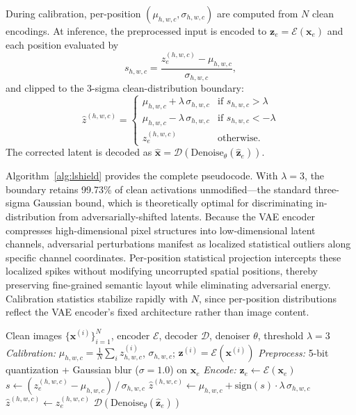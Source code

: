 \documentclass[conference]{IEEEtran}
\begin{document}
\label{sec:algorithm}
During calibration, per-position $(\mu_{h,w,c},\sigma_{h,w,c})$ are computed from
$N$ clean encodings. At inference, the preprocessed input is encoded to
$\mathbf{z}_e\!=\!\mathcal{E}(\mathbf{x}_e)$ and each position evaluated by
\begin{equation}
  s_{h,w,c} = \frac{z_e^{(h,w,c)} - \mu_{h,w,c}}{\sigma_{h,w,c}},
\end{equation}
and clipped to the 3-sigma clean-distribution boundary:
\begin{equation}
  \hat{z}^{(h,w,c)} =
  \begin{cases}
    \mu_{h,w,c} + \lambda\,\sigma_{h,w,c} & \text{if } s_{h,w,c} > \lambda \\
    \mu_{h,w,c} - \lambda\,\sigma_{h,w,c} & \text{if } s_{h,w,c} < -\lambda \\
    z_e^{(h,w,c)} & \text{otherwise.}
  \end{cases}
\end{equation}
The corrected latent is decoded as
$\hat{\mathbf{x}}\!=\!\mathcal{D}(\mathrm{Denoise}_\theta(\hat{\mathbf{z}}_e))$.

Algorithm~\ref{alg:lshield} provides the complete pseudocode.
With $\lambda\!=\!3$, the boundary retains 99.73\% of clean activations
unmodified---the standard three-sigma Gaussian bound, which is theoretically
optimal for discriminating in-distribution from adversarially-shifted latents.
Because the VAE encoder compresses high-dimensional pixel structures into low-dimensional latent channels, adversarial perturbations manifest as localized statistical outliers along specific channel coordinates. Per-position statistical projection intercepts these localized spikes without modifying uncorrupted spatial positions, thereby preserving fine-grained semantic layout while eliminating adversarial energy. Calibration statistics stabilize rapidly with $N$, since per-position
distributions reflect the VAE encoder's fixed architecture rather than image
content.

\begin{algorithm}[b]
\caption{L-SHIELD Defense}
\label{alg:lshield}
{\small
\begin{algorithmic}[1]
\REQUIRE Clean images $\{\mathbf{x}^{(i)}\}_{i=1}^{N}$, encoder $\mathcal{E}$,
  decoder $\mathcal{D}$, denoiser $\theta$, threshold $\lambda{=}3$
\STATE \textit{Calibration:} $\mu_{h,w,c}\!=\!\frac{1}{N}\sum_i z^{(i)}_{h,w,c}$,
  $\sigma_{h,w,c}$; $\mathbf{z}^{(i)}\!=\!\mathcal{E}(\mathbf{x}^{(i)})$
\STATE \textit{Preprocess:} 5-bit quantization + Gaussian blur ($\sigma{=}1.0$) on $\mathbf{x}_e$
\STATE \textit{Encode:} $\mathbf{z}_e \leftarrow \mathcal{E}(\mathbf{x}_e)$
  \STATE $s \leftarrow (z_e^{(h,w,c)} - \mu_{h,w,c})\,/\,\sigma_{h,w,c}$
    \STATE $\hat{z}^{(h,w,c)} \leftarrow \mu_{h,w,c} + \mathrm{sign}(s)\cdot\lambda\,\sigma_{h,w,c}$
  \ELSE
    \STATE $\hat{z}^{(h,w,c)} \leftarrow z_e^{(h,w,c)}$
  \ENDIF
\ENDFOR
\RETURN $\mathcal{D}\!\left(\mathrm{Denoise}_{\theta}(\hat{\mathbf{z}}_e)\right)$
\end{algorithmic}
}
\end{algorithm}
\end{document}
